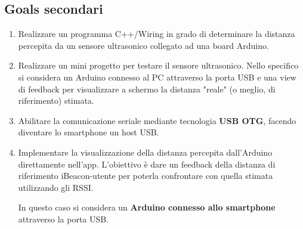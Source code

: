 \subsection{Goals secondari}
\begin{enumerate}	
	\item Realizzare un programma C++/Wiring in grado di determinare la distanza percepita da un sensore ultrasonico collegato ad una board Arduino.
	
	\item Realizzare un mini progetto per testare il sensore ultrasonico. Nello specifico si considera un Arduino connesso al PC attraverso la porta USB e una view di feedback per visualizzare a schermo la distanza "reale" (o meglio, di riferimento) stimata.
	
	\item Abilitare la comunicazione seriale mediante tecnologia \textbf{USB OTG}, facendo diventare lo smartphone un host USB.
	
	\item Implementare la visualizzazione della distanza percepita dall'Arduino direttamente nell'app. L'obiettivo è dare un feedback della distanza di riferimento iBeacon-utente per poterla confrontare con quella stimata utilizzando gli RSSI. 
	
	In questo caso si considera un \textbf{Arduino connesso allo smartphone} attraverso la porta USB.
\end{enumerate}



